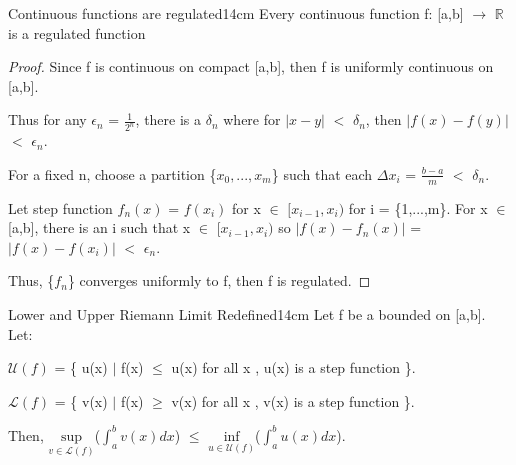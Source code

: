     \newpage



    \begin{wtheorem}{Continuous functions are regulated}{14cm}
        Every continuous function f: [a,b] $\rightarrow$ $\mathbb{R}$
        is a regulated function
    \end{wtheorem}

    \begin{proof}
        Since f is continuous on compact [a,b], then f is uniformly continuous
        on [a,b].

        Thus for any $\epsilon_n$ = $\frac{1}{2^n}$, there is a $\delta_n$
        where for $|x-y|$ $<$ $\delta_n$, then $|f(x) - f(y)|$ $<$ $\epsilon_n$.

        For a fixed n, choose a partition \{$x_0,...,x_m$\}
        such that each $\Delta x_i$ = $\frac{b-a}{m}$ $<$ $\delta_n$.

        Let step function $f_n(x)$ = $f(x_i)$ for x $\in$ $[x_{i-1},x_i)$
        for i = \{1,...,m\}.
        For x $\in$ [a,b], there is an i such that
        x $\in$ $[x_{i-1},x_i)$ so
        $|f(x) - f_n(x)|$
        = $|f(x) - f(x_i)|$
        $<$ $\epsilon_n$.

        Thus, \{$f_n$\} converges uniformly to f, then f is regulated.
    \end{proof}

    \vspace{0.5cm}



    \begin{wtheorem}{Lower and Upper Riemann Limit Redefined}{14cm}
        Let f be a bounded on [a,b]. Let:

        \hspace{0.5cm}
        $\mathcal{U}(f)$
        = \{ u(x) $|$ f(x) $\leq$ u(x) for all x , u(x) is a step function \}.
        
        \hspace{0.5cm}
        $\mathcal{L}(f)$
        = \{ v(x) $|$ f(x) $\geq$ v(x) for all x , v(x) is a step function \}.
        
        Then,
        $\underset{v \in \mathcal{L}(f)}{\text{sup}}$($\int_a^b v(x) dx$)
        $\leq$ $\underset{u \in \mathcal{U}(f)}{\text{inf}}$($\int_a^b u(x) dx$).
    \end{wtheorem}

